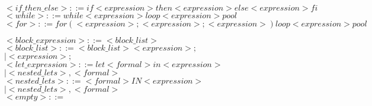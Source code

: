 \documentclass[11pt]{article}
\begin{document}
\begin{enumerate}
$<if\_then\_else>            ::= if <expression> then <expression> else <expression> fi$\\

$<while>                   ::= while <expression> loop <expression> pool$\\
\color{blue}
$<for>                   ::= for ( <expression> ; <expression> ; <expression> ) loop <expression> pool$\\
\color{black}

$<block\_expression>        ::= { <block\_list> }$\\

$<block\_list>              ::= <block\_list> <expression> ;$\\
                          \hspace*{3.2cm}$|   <expression> ;$\\

$<let\_expression>          ::= let <formal> in <expression>$\\
                          \hspace*{3.8cm}$|   <nested\_lets> , <formal>$\\

$<nested\_lets>            ::= <formal> IN <expression>$\\
                          \hspace*{3.2cm}$|   <nested\_lets> , <formal>$\\

$<empty>                   ::=  $\\

    
    

\end{enumerate}
\end{document}

